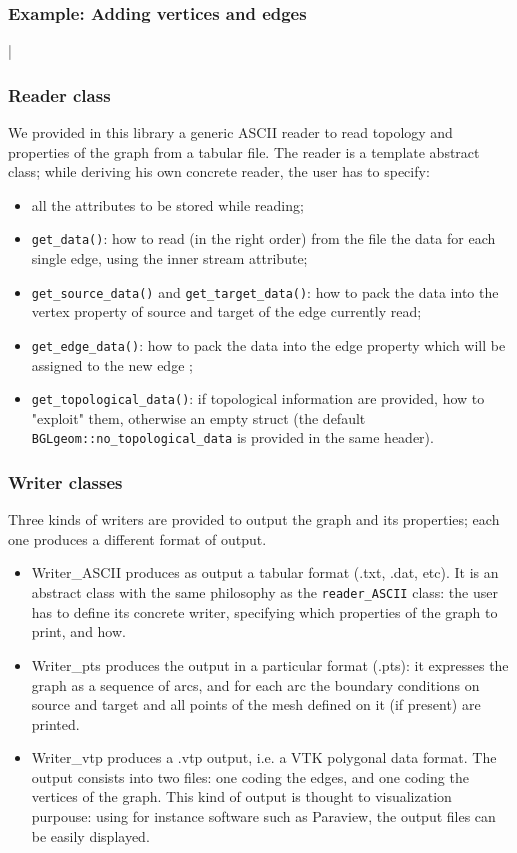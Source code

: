 \documentclass[11pt]{beamer}
\begin{document}
	\begin{frame}
	\frametitle{Example: Adding vertices and edges}
	\lstIII|
	\end{frame}

	\begin{frame}
	\lstIIII
	\end{frame}
	
	\begin{frame}
		\frametitle{Reader class}
		We provided in this library a generic ASCII reader to read topology and properties of the graph from a tabular file. The reader is a template abstract class; while deriving his own concrete reader, the user has to specify:
		\begin{itemize}
			\item all the attributes to be stored while reading;
			\item \texttt{get\_data()}: how to read (in the right order) from the file the data for each single edge, using the inner stream attribute;
			\item \texttt{get\_source\_data()} and \texttt{get\_target\_data()}: how to pack the data into the vertex property of source and target of the edge currently read;
			\item \texttt{get\_edge\_data()}: how to pack the data into the edge property which will be assigned to the new edge ;
			\item \texttt{get\_topological\_data()}: if topological information are provided, how to "exploit" them, otherwise an empty struct (the default \texttt{BGLgeom::no\_topological\_data} is provided in the same header).
		\end{itemize}
	\end{frame}
	
	\begin{frame}
		\frametitle{Writer classes}
		Three kinds of writers are provided to output the graph and its properties; each one produces a different format of output.
		\begin{itemize}
			\item{Writer\_ASCII} produces as output a tabular format (.txt, .dat, etc). It is an abstract class with the same philosophy as the \texttt{reader\_ASCII} class: the user has to define its concrete writer, specifying which properties of the graph to print, and how.
			\item{Writer\_pts} produces the output in a particular format (.pts): it expresses the graph as a sequence of arcs, and for each arc the boundary conditions on source and target and all points of the mesh defined on it (if present) are printed. 
			\item{Writer\_vtp} produces a .vtp output, i.e. a VTK polygonal data format. The output consists into two files: one coding the edges, and one coding the vertices of the graph. This kind of output is thought to visualization purpouse: using for instance software such as Paraview, the output files can be easily displayed.
		\end{itemize}
		\end{frame}			
		
\end{document}
